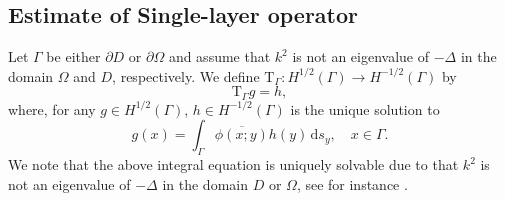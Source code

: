 \documentclass[final]{siamltex}
\newcommand{\ind}{\,\mbox{d}}
\begin{document}
\subsection{Estimate of Single-layer operator}
%
Let $\Gamma$ be either $\partial D$ or $\partial \Omega$ and assume that $k^2$ is not an eigenvalue of $-\Delta$ in the domain  $\Omega$ and $D$, respectively. We define $ \mathrm{T}_\Gamma: H^{1/2}(\Gamma) \to H^{-1/2}(\Gamma)$ by
\begin{equation} \label{def T 1}
\mathrm{T}_\Gamma g=h,
\end{equation}
where, for any $g \in H^{1/2}(\Gamma)$, $h \in H^{-1/2}(\Gamma)$ is the unique solution to
\begin{equation} \label{def T 2}
g(x) = \int_{\Gamma} \overline{ \phi(x;y)} h(y) \ind s_y, \quad  x \in   \Gamma.
\end{equation}
We note that the above integral equation is uniquely solvable due to that $k^2$ is not an eigenvalue of $-\Delta$ in the domain $D$ or $\Omega$, see for instance \cite{McLean2000,CK,kirsch2008factorization}.
\end{document}
